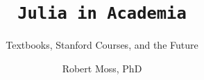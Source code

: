 \documentclass[aspectratio=169]{beamer-pytex}
\title{\texttt{Julia in Academia}}
\subtitle{Textbooks, Stanford Courses, and the Future}
\author{Robert Moss, PhD}
\institute{Stanford University | JuliaCon 2025}
\date{}
\begin{document}
\begin{frame}
    \maketitle
\end{frame}




















\end{document}
